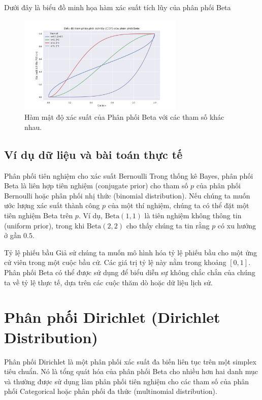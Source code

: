 	Dưới đây là biểu đồ minh họa hàm xác suất tích lũy của phân phối Beta
	
		\begin{figure}[h!]
		\centering
		\includegraphics[width=0.7\textwidth]{images/Beta Distribution-CDF.png} %
		\caption{Hàm mật độ xác suất của Phân phối Beta với các tham số khác nhau.}
		\label{fig:Beta Distribution-CDF}
	\end{figure}
	
	\subsection{Ví dụ dữ liệu và bài toán thực tế}
		Phân phối tiên nghiệm cho xác suất Bernoulli
		Trong thống kê Bayes, phân phối Beta là liên hợp tiên nghiệm (conjugate prior) cho tham số $p$ của phân phối Bernoulli hoặc phân phối nhị thức (binomial distribution). Nếu chúng ta muốn ước lượng xác suất thành công $p$ của một thí nghiệm, chúng ta có thể đặt một tiên nghiệm Beta trên $p$. Ví dụ, $\text{Beta}(1,1)$ là tiên nghiệm không thông tin (uniform prior), trong khi $\text{Beta}(2,2)$ cho thấy chúng ta tin rằng $p$ có xu hướng ở gần $0.5$.
	
		Tỷ lệ phiếu bầu
		Giả sử chúng ta muốn mô hình hóa tỷ lệ phiếu bầu cho một ứng cử viên trong một cuộc bầu cử. Các giá trị tỷ lệ này nằm trong khoảng $[0, 1]$. Phân phối Beta có thể được sử dụng để biểu diễn sự không chắc chắn của chúng ta về tỷ lệ thực tế, dựa trên các cuộc thăm dò hoặc dữ liệu lịch sử.
	
\section{Phân phối Dirichlet (Dirichlet Distribution)}
	Phân phối Dirichlet là một phân phối xác suất đa biến liên tục trên một simplex tiêu chuẩn. Nó là tổng quát hóa của phân phối Beta cho nhiều hơn hai danh mục và thường được sử dụng làm phân phối tiên nghiệm cho các tham số của phân phối Categorical hoặc phân phối đa thức (multinomial distribution).
	

